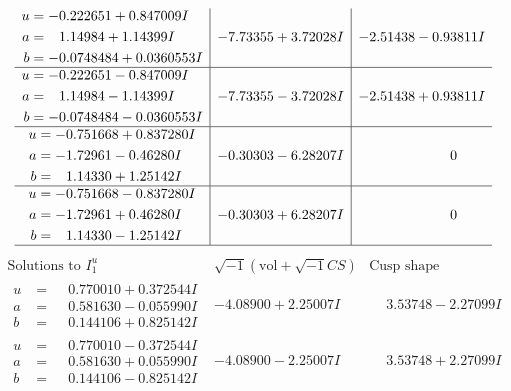 \documentclass[1p]{elsarticle_modified}
\theoremstyle{definition}
\newcommand{\I}{\sqrt{-1}}
\begin{document}
$$\begin{array}{c|c|c}
\begin{aligned}
u &= -0.222651 + 0.847009 I \\
a &= \phantom{-}1.14984 + 1.14399 I \\
b &= -0.0748484 + 0.0360553 I\end{aligned}
 & -7.73355 + 3.72028 I & -2.51438 - 0.93811 I \\ \hline\begin{aligned}
u &= -0.222651 - 0.847009 I \\
a &= \phantom{-}1.14984 - 1.14399 I \\
b &= -0.0748484 - 0.0360553 I\end{aligned}
 & -7.73355 - 3.72028 I & -2.51438 + 0.93811 I \\ \hline\begin{aligned}
u &= -0.751668 + 0.837280 I \\
a &= -1.72961 - 0.46280 I \\
b &= \phantom{-}1.14330 + 1.25142 I\end{aligned}
 & -0.30303 - 6.28207 I & \phantom{-0.000000 } 0 \\ \hline\begin{aligned}
u &= -0.751668 - 0.837280 I \\
a &= -1.72961 + 0.46280 I \\
b &= \phantom{-}1.14330 - 1.25142 I\end{aligned}
 & -0.30303 + 6.28207 I & \phantom{-0.000000 } 0\\
 \hline 
 \end{array}$$\newpage$$\begin{array}{c|c|c}  
\text{Solutions to }I^u_{1}& \I (\text{vol} + \sqrt{-1}CS) & \text{Cusp shape}\\
 \hline 
\begin{aligned}
u &= \phantom{-}0.770010 + 0.372544 I \\
a &= \phantom{-}0.581630 - 0.055990 I \\
b &= \phantom{-}0.144106 + 0.825142 I\end{aligned}
 & -4.08900 + 2.25007 I & \phantom{-}3.53748 - 2.27099 I \\ \hline\begin{aligned}
u &= \phantom{-}0.770010 - 0.372544 I \\
a &= \phantom{-}0.581630 + 0.055990 I \\
b &= \phantom{-}0.144106 - 0.825142 I\end{aligned}
 & -4.08900 - 2.25007 I & \phantom{-}3.53748 + 2.27099 I \\ \hline\begin{aligned}

\end{aligned}
\end{array}$$
\end{document}

